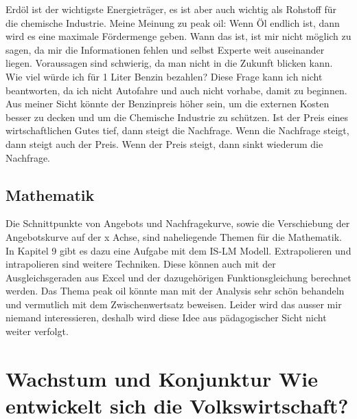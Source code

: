 \documentclass[11pt, twocolumn, a4paper]{scrartcl}
\begin{document}
Erdöl ist der wichtigste Energieträger, es ist aber auch wichtig als Rohstoff für die chemische Industrie.
Meine Meinung zu peak oil: Wenn Öl endlich ist, dann wird es eine maximale Fördermenge geben. Wann das ist, ist mir nicht möglich zu sagen, da mir die Informationen fehlen und selbst Experte weit auseinander liegen. Voraussagen sind schwierig, da man nicht in die Zukunft blicken kann. Wie viel würde ich für 1 Liter Benzin bezahlen? Diese Frage kann ich nicht beantworten, da ich nicht Autofahre und auch nicht vorhabe, damit zu beginnen. Aus meiner Sicht könnte der Benzinpreis höher sein, um die externen Kosten besser zu decken und um die Chemische Industrie zu schützen. Ist der Preis eines wirtschaftlichen Gutes tief, dann steigt die Nachfrage. Wenn die Nachfrage steigt, dann steigt auch der Preis. Wenn der Preis steigt, dann sinkt wiederum die Nachfrage.

\subsection{Mathematik}
Die Schnittpunkte von Angebots und Nachfragekurve, sowie die Verschiebung der Angebotskurve auf der x Achse, sind naheliegende Themen für die Mathematik. In Kapitel 9 gibt es dazu eine Aufgabe mit dem IS-LM Modell. Extrapolieren und intrapolieren sind weitere Techniken. Diese können auch mit der Ausgleichsgeraden aus Excel und der dazugehörigen Funktionsgleichung berechnet werden.   Das Thema peak oil könnte man mit der Analysis sehr schön behandeln und vermutlich mit dem Zwischenwertsatz beweisen. Leider wird das ausser mir niemand interessieren, deshalb wird diese Idee aus pädagogischer Sicht nicht weiter verfolgt.


\section{Wachstum und Konjunktur \flqq Wie entwickelt sich die Volkswirtschaft?\frqq}
\end{document}
